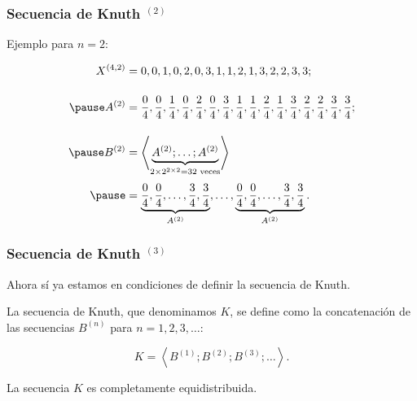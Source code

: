 \documentclass[t, 10pt, mathserif]{beamer}
\begin{document}

\begin{frame}
  \frametitle{Secuencia de Knuth {$^{(2)}$}}

  Ejemplo para $n = 2$:
  \pause

  \begin{equation*}
    \begin{aligned}
      X^{(4, 2)} & = 0, 0, 1, 0, 2, 0, 3, 1, 1, 2, 1, 3, 2, 2, 3, 3 \text{;} \\[0.4cm] \pause
      A^{(2)}    & = \frac{0}{4}, \frac{0}{4}, \frac{1}{4}, \frac{0}{4}, \frac{2}{4}, \frac{0}{4}, \frac{3}{4}, \frac{1}{4}, \frac{1}{4}, \frac{2}{4}, \frac{1}{4}, \frac{3}{4}, \frac{2}{4}, \frac{2}{4}, \frac{3}{4}, \frac{3}{4} \text{;} \\[0.4cm] \pause
      B^{(2)}   & = \left< \underbrace{A^{(2)} ; \dots ; A^{(2)}}_{2 \times 2^{2 \times 2} = 32 \text{ veces}} \right> \\[0.1cm] \pause
                & = \underbrace{\frac{0}{4}, \frac{0}{4}, \dots, \frac{3}{4}, \frac{3}{4}}_{A^{(2)}}, \dots, \underbrace{\frac{0}{4}, \frac{0}{4}, \dots, \frac{3}{4}, \frac{3}{4}}_{A^{(2)}} \text{.}
    \end{aligned}
  \end{equation*}
\end{frame}


\begin{frame}
  \frametitle{Secuencia de Knuth {$^{(3)}$}}

  Ahora sí ya estamos en condiciones de definir la secuencia de Knuth.
  \pause

  \medskip
  \begin{definition}
    \medskip
    La secuencia de Knuth, que denominamos $K$, se define como la concatenación de las secuencias $B^{(n)}$ para $n = 1, 2, 3, \dots$:
    \pause

    \begin{equation*}
      K = \left< B^{(1)} ; B^{(2)} ;  B^{(3)} ; \dots \right> \text{.}
    \end{equation*}
  \end{definition}
  \pause

  \medskip
  \begin{theorem}
    \medskip
    La secuencia $K$ es completamente equidistribuida.
  \end{theorem}
\end{frame}
\end{document}
